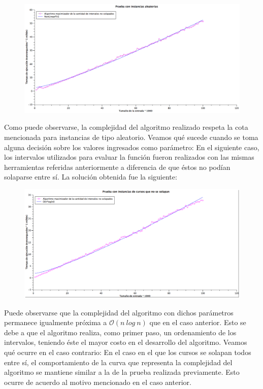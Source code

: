 \begin{figure}[H] %
\begin{center}
\includegraphics[width=460pt]{../imgs/graficoej2_aleatorios.png}
\end{center}
\end{figure}

Como puede observarse, la complejidad del algoritmo realizado respeta la cota mencionada para instancias de tipo aleatorio. Veamos qué sucede cuando se toma alguna decisión sobre los valores ingresados como parámetro:\newline
\newline
En el siguiente caso, los intervalos utilizados para evaluar la función fueron realizados con las mismas herramientas referidas anteriormente a diferencia de que éstos no podían solaparse entre sí. La solución obtenida fue la siguiente:
\begin{figure}[H] %
\begin{center}
\includegraphics[width=460pt]{../imgs/graficoej2_distintos.png}
\end{center}
\end{figure}
Puede observarse que la complejidad del algoritmo con dichos parámetros permanece igualmente próxima a $\mathcal{O}(n\ log\ n)$ que en el caso anterior. Esto se debe a que el algoritmo realiza, como primer paso, un ordenamiento de los intervalos, teniendo éste el mayor costo en el desarrollo del algoritmo. Veamos qué ocurre en el caso contrario:\newline
\newline
En el caso en el que los cursos se solapan todos entre sí, el comportamiento de la curva que representa la complejidad del algoritmo se mantiene similar a la de la prueba realizada previamente. Esto ocurre de acuerdo al motivo mencionado en el caso anterior.

